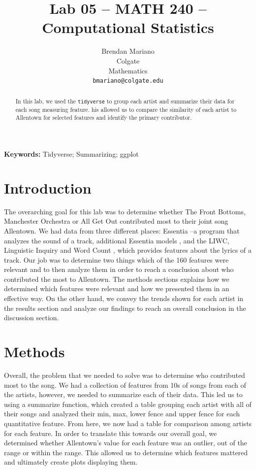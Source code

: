 \documentclass{article}\usepackage[]{graphicx}\usepackage[]{xcolor}
\begin{document}
\vspace{-1in}
\title{Lab 05 -- MATH 240 -- Computational Statistics}

\author{
  Brendan Mariano \\
  Colgate  \\
  Mathematics  \\
  {\tt bmariano@colgate.edu}
}

\date{}

\maketitle

\begin{multicols}{2}
\begin{abstract}
In this lab, we used the \texttt{tidyverse} to group each artist and summarize their data for each song measuring feature. his allowed us to compare the similarity of each artist to Allentown for selected features and identify the primary contributor.
\end{abstract}

\noindent \textbf{Keywords:} Tidyverse; Summarizing; ggplot

\section{Introduction}
The overarching goal for this lab was to determine whether The Front Bottoms, Manchester Orchestra or All Get Out contributed most to their joint song Allentown. We had data from three different places: Essentia \citep{essentia}--a program that analyzes the sound of a track, additional Essentia models \citep{essentia_models}, and the LIWC, Linguistic Inquiry and Word Count \citep{liwc}, which provides features about the lyrics of a track. Our job was to determine two things which of the 160 features were relevant and to then analyze them in order to reach a conclusion about who contributed the most to Allentown. 
  The methods sections explains how we determined which features were relevant and how we presented them in an effective way. On the other hand, we convey the trends shown for each artist in the results section and analyze our findings to reach an overall conclusion in the discussion section. 


\section{Methods}
  Overall, the problem that we needed to solve was to determine who contributed most to the song. We had a collection of features from 10s of songs from each of the artists, however, we needed to summarize each of their data. This led us to using a summarize function, which created a table grouping each artist with all of their songs and analyzed their min, max, lower fence and upper fence for each quantitative feature. From here, we now had a table for comparison among artists for each feature. In order to translate this towards our overall goal, we determined whether Allentown's value for each feature was an outlier, out of the range or within the range. This allowed us to determine which features mattered and ultimately create plots displaying them.
  

\end{multicols}
\end{document}
